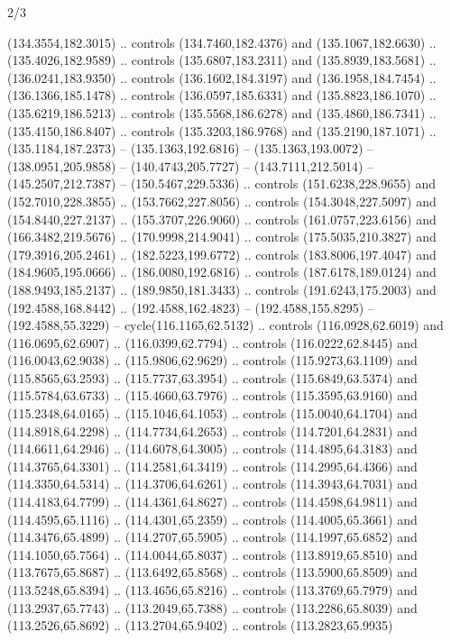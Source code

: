 \begin{flagdescription}{2/3}
\begin{scope}[shift={(0.5\flaglength,0.5)},scale=\flagwidth/320]
\begin{scope}[y=0.8pt, x=0.8pt, yscale=-1,shift={(-118.3,-146)}]
  (134.3554,182.3015) .. controls (134.7460,182.4376) and (135.1067,182.6630) ..
  (135.4026,182.9589) .. controls (135.6807,183.2311) and (135.8939,183.5681) ..
  (136.0241,183.9350) .. controls (136.1602,184.3197) and (136.1958,184.7454) ..
  (136.1366,185.1478) .. controls (136.0597,185.6331) and (135.8823,186.1070) ..
  (135.6219,186.5213) .. controls (135.5568,186.6278) and (135.4860,186.7341) ..
  (135.4150,186.8407) .. controls (135.3203,186.9768) and (135.2190,187.1071) ..
  (135.1184,187.2373) -- (135.1363,192.6816) -- (135.1363,193.0072) --
  (138.0951,205.9858) -- (140.4743,205.7727) -- (143.7111,212.5014) --
  (145.2507,212.7387) -- (150.5467,229.5336) .. controls (151.6238,228.9655) and
  (152.7010,228.3855) .. (153.7662,227.8056) .. controls (154.3048,227.5097) and
  (154.8440,227.2137) .. (155.3707,226.9060) .. controls (161.0757,223.6156) and
  (166.3482,219.5676) .. (170.9998,214.9041) .. controls (175.5035,210.3827) and
  (179.3916,205.2461) .. (182.5223,199.6772) .. controls (183.8006,197.4047) and
  (184.9605,195.0666) .. (186.0080,192.6816) .. controls (187.6178,189.0124) and
  (188.9493,185.2137) .. (189.9850,181.3433) .. controls (191.6243,175.2003) and
  (192.4588,168.8442) .. (192.4588,162.4823) -- (192.4588,155.8295) --
  (192.4588,55.3229) -- cycle(116.1165,62.5132) .. controls (116.0928,62.6019)
  and (116.0695,62.6907) .. (116.0399,62.7794) .. controls (116.0222,62.8445)
  and (116.0043,62.9038) .. (115.9806,62.9629) .. controls (115.9273,63.1109)
  and (115.8565,63.2593) .. (115.7737,63.3954) .. controls (115.6849,63.5374)
  and (115.5784,63.6733) .. (115.4660,63.7976) .. controls (115.3595,63.9160)
  and (115.2348,64.0165) .. (115.1046,64.1053) .. controls (115.0040,64.1704)
  and (114.8918,64.2298) .. (114.7734,64.2653) .. controls (114.7201,64.2831)
  and (114.6611,64.2946) .. (114.6078,64.3005) .. controls (114.4895,64.3183)
  and (114.3765,64.3301) .. (114.2581,64.3419) .. controls (114.2995,64.4366)
  and (114.3350,64.5314) .. (114.3706,64.6261) .. controls (114.3943,64.7031)
  and (114.4183,64.7799) .. (114.4361,64.8627) .. controls (114.4598,64.9811)
  and (114.4595,65.1116) .. (114.4301,65.2359) .. controls (114.4005,65.3661)
  and (114.3476,65.4899) .. (114.2707,65.5905) .. controls (114.1997,65.6852)
  and (114.1050,65.7564) .. (114.0044,65.8037) .. controls (113.8919,65.8510)
  and (113.7675,65.8687) .. (113.6492,65.8568) .. controls (113.5900,65.8509)
  and (113.5248,65.8394) .. (113.4656,65.8216) .. controls (113.3769,65.7979)
  and (113.2937,65.7743) .. (113.2049,65.7388) .. controls (113.2286,65.8039)
  and (113.2526,65.8692) .. (113.2704,65.9402) .. controls (113.2823,65.9935)

\end{scope}
\end{scope}
\end{flagdescription}
